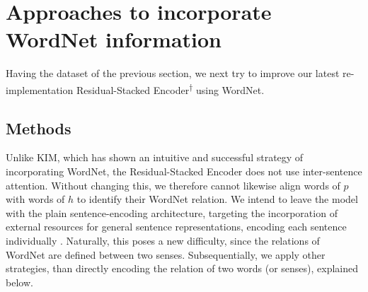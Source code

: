 \section{Approaches to incorporate WordNet information}\label{sec:approaches_ext_res}
Having the dataset of the previous section, we next try to improve our latest re-implementation Residual-Stacked Encoder\textsuperscript{$\dagger$} using WordNet. 
\subsection{Methods}
Unlike \ac{KIM}, which has shown an intuitive and successful strategy of incorporating WordNet, the Residual-Stacked Encoder does not use inter-sentence attention. Without changing this, we therefore cannot likewise align words of $p$ with words of $h$ to identify their WordNet relation. We intend to leave the model with the plain sentence-encoding architecture, targeting the incorporation of external resources for general sentence representations, encoding each sentence individually \citep{nangia2017repeval}. Naturally, this poses a new difficulty, since the relations of WordNet are defined between two senses. Subsequentially, we apply other strategies, than directly encoding the relation of two words (or senses), explained below.
